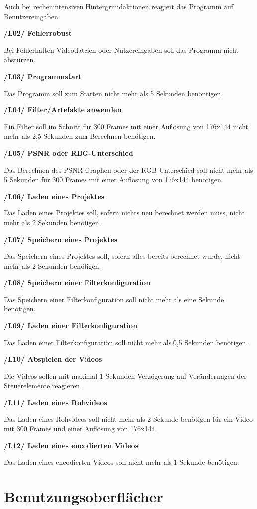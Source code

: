 \documentclass[parskip=full]{scrartcl}
\begin{document}
Auch bei rechenintensiven Hintergrundaktionen reagiert das Programm auf Benutzereingaben.

\textbf{/L02/ Fehlerrobust}

Bei Fehlerhaften Videodateien oder Nutzereingaben soll das Programm nicht abstürzen.

\textbf{/L03/ Programmstart}

Das Programm soll zum Starten nicht mehr als 5 Sekunden benöntigen.

\textbf{/L04/ Filter/Artefakte anwenden}

Ein Filter soll im Schnitt für 300 Frames mit einer Auflösung von 176x144 nicht mehr als 2,5 Sekunden zum Berechnen benötigen.

\textbf{/L05/ PSNR oder RBG-Unterschied}

Das Berechnen des PSNR-Graphen oder der RGB-Unterschied soll nicht mehr als 5 Sekunden für 300 Frames mit einer Auflösung von 176x144 benötigen.

\textbf{/L06/ Laden eines Projektes}

Das Laden eines Projektes soll, sofern nichts neu berechnet werden muss, nicht mehr als 2 Sekunden benötigen.

\textbf{/L07/ Speichern eines Projektes}

Das Speichern eines Projektes soll, sofern alles bereits berechnet wurde, nicht mehr als 2 Sekunden benötigen.

\textbf{/L08/ Speichern einer Filterkonfiguration}

Das Speichern einer Filterkonfiguration soll nicht mehr als eine Sekunde benötigen.

\textbf{/L09/ Laden einer Filterkonfiguration}

Das Laden einer Filterkonfiguration soll nicht mehr als 0,5 Sekunden benötigen.

\newpage
\textbf{/L10/ Abspielen der Videos}

Die Videos sollen mit maximal 1 Sekunden Verzögerung auf Veränderungen der Steuerelemente reagieren.

\textbf{/L11/ Laden eines Rohvideos}

Das Laden eines Rohvideos soll nicht mehr als 2 Sekunde benötigen für ein Video mit 300 Frames und einer Auflösung von 176x144.

\textbf{/L12/ Laden eines encodierten Videos}

Das Laden eines encodierten Videos soll nicht mehr als 1 Sekunde benötigen.
\newpage
\section{Benutzungsoberflächer}
\end{document}
